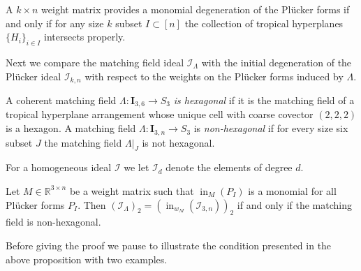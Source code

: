 \documentclass[ALCO,ThmDefs,Unicode,epreuves]{cedram}
\DeclareMathOperator{\ini}{in}
\newcommand{\I}{\mathcal{I}}
\begin{document}
\begin{coro}
A $k \times n$ weight matrix provides a monomial degeneration of the Pl{\"u}cker forms if and only if for any size $k$ subset $I \subset [n]$ the collection of tropical hyperplanes $\{H_i\}_{i \in I}$ intersects properly. 
\end{coro}


Next we compare the matching field ideal $\I_{\Lambda}$ 
with the initial degeneration of the Pl{\"u}cker ideal $\I_{k, n}$ {with respect to the weights on the Pl{\"u}cker forms induced by $\Lambda$. }



\begin{Definition}\label{def:hex}
A coherent matching field $\Lambda \colon \mathbf{I}_{3, 6} \to S_3$ \emph{is hexagonal} if it is the matching field of a tropical hyperplane arrangement whose unique cell with coarse covector $(2, 2, 2)$ is a hexagon. 
A matching field $\Lambda \colon \mathbf{I}_{3, n} \to S_3$ is \emph{non-hexagonal} if for every size six subset $J$ the matching field $\Lambda|_J$ is not hexagonal. 
\end{Definition}

For a homogeneous ideal $\I$ we let $\I_d$ denote the elements of degree $d$. 


\begin{Proposition}\label{prop:deg2hex}
Let $M \in \mathbb{R}^{3 \times n}$ be a weight matrix such that $\ini_M(P_I)$ is a monomial for all Pl{\"u}cker forms $P_I$. Then 
$(\I_{\Lambda})_2 = (\ini_{w_M}(\I_{3,n}))_2$ if and only if 
the matching field is non-hexagonal. 
\end{Proposition}

Before giving the proof we pause to illustrate the condition presented in the above proposition with two examples. 
\end{document}
